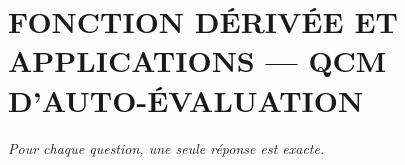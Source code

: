 
\section*{\textcolor{chapcolor}{\MakeUppercase{Fonction dérivée et applications — QCM d'auto-évaluation}}}

\begin{center}
\textit{Pour chaque question, une seule réponse est exacte.}
\end{center}

